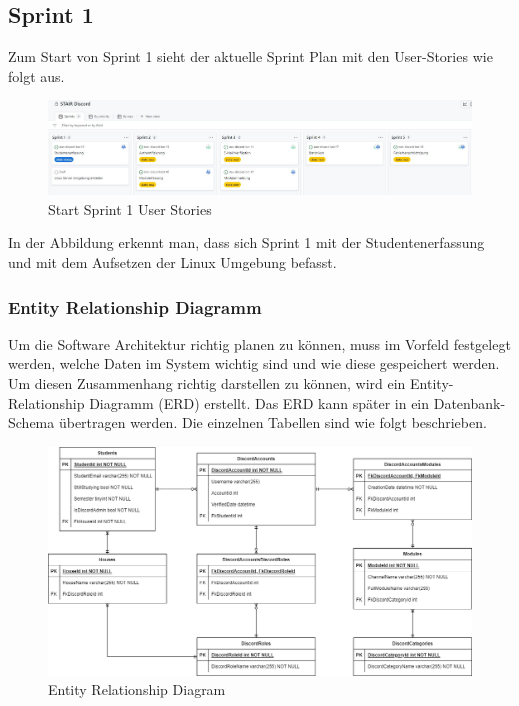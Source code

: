 \documentclass[a4paper, table]{article}
\begin{document}
\newpage
\subsection{Sprint 1}
Zum Start von Sprint 1 sieht der aktuelle Sprint Plan mit den User-Stories wie folgt aus.
\begin{figure}[h]
    \centering
    \hspace*{-2cm}
    \includegraphics[width=1.3\textwidth]{img/Start_Sprint1_Stories.jpg}
    \caption{Start Sprint 1 User Stories}
    \label{fig:start_sprint_one}
\end{figure}
In der Abbildung erkennt man, dass sich Sprint 1 mit der Studentenerfassung und mit dem Aufsetzen der Linux Umgebung befasst.

\subsubsection{Entity Relationship Diagramm}\label{entity-relationship-diagramm}
Um die Software Architektur richtig planen zu können, muss im Vorfeld festgelegt werden, welche Daten im System wichtig sind und wie diese gespeichert werden. 
Um diesen Zusammenhang richtig darstellen zu können, wird ein Entity-Relationship Diagramm (ERD) erstellt. 
Das ERD kann später in ein Datenbank-Schema übertragen werden. 
Die einzelnen Tabellen sind wie folgt beschrieben.

\begin{figure}[h]
    \centering
    \includegraphics[width=1\textwidth]{img/ER-Diagramm.png}
    \caption{Entity Relationship Diagram}
    \label{fig:ER-Diagram}
\end{figure}
\end{document}
